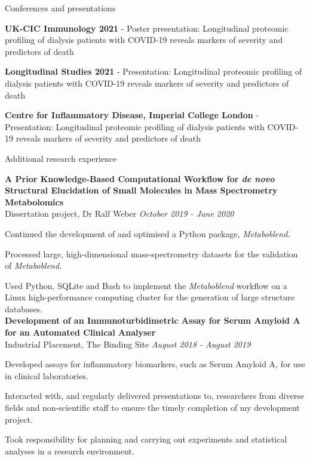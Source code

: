 \documentclass{resume}
\begin{document}
\begin{rSection}{Conferences and presentations}

\item \textbf{UK-CIC Immunology 2021} - Poster presentation: Longitudinal proteomic profiling of dialysis patients with COVID-19 reveals markers of severity and predictors of death

\item \textbf{Longitudinal Studies 2021} - Presentation: Longitudinal proteomic profiling of dialysis patients with COVID-19 reveals markers of severity and predictors of death

\item \textbf{Centre for Inflammatory Disease, Imperial College London} - Presentation: Longitudinal proteomic profiling of dialysis patients with COVID-19 reveals markers of severity and predictors of death

\end{rSection}

\begin{rSection}{Additional research experience}

\textbf{A Prior Knowledge-Based Computational Workflow for \textit{de novo} Structural Elucidation of Small Molecules in Mass Spectrometry Metabolomics} \\
Dissertation project, Dr Ralf Weber \hfill  \textit{October 2019 - June 2020}

\smallskip
\item Continued the development of and optimised a Python package, \textit{Metaboblend}.
\item Processed large, high-dimensional mass-spectrometry datasets for the validation of \textit{Metaboblend}. 
\item Used Python, SQLite and Bash to implement the \textit{Metaboblend} workflow on a Linux high-performance computing cluster for the generation of large structure databases. \\

\textbf{Development of an Immunoturbidimetric Assay for Serum Amyloid A for an Automated Clinical Analyser} \\
Industrial Placement, The Binding Site \hfill  \textit{August 2018 - August 2019}

\smallskip
\item Developed assays for inflammatory biomarkers, such as Serum Amyloid A, for use in clinical laboratories.
\item Interacted with, and regularly delivered presentations to, researchers from diverse fields and non-scientific staff to ensure the timely completion of my development project. 
\item Took responsibility for planning and carrying out experiments and statistical analyses in a research environment.  \\

\end{rSection}
\end{document}
